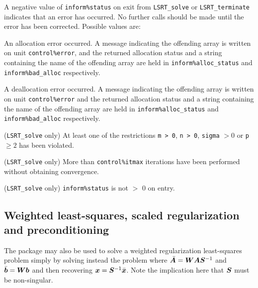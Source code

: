 \documentclass{galahad}
\newcommand{\packagename}{LS\-RT}
\begin{document}

\galerrors
A negative value of  {\tt inform\%status} on exit from
{\tt \packagename\_solve}
or
{\tt \packagename\_terminate}
indicates that an error has occurred. No further calls should be made
until the error has been corrected. Possible values are:

\begin{description}
 An allocation error occurred. A message indicating
the offending
array is written on unit {\tt control\%error}, and the returned allocation
status and a string containing the name of the offending array
are held in {\tt inform\%alloc\_\-status}
and {\tt inform\%bad\_alloc} respectively.

 A deallocation error occurred.
A message indicating the offending
array is written on unit {\tt control\%error} and the returned allocation
status and a string containing the name of the offending array
are held in {\tt inform\%alloc\_\-status}
and {\tt inform\%bad\_alloc} respectively.

 ({\tt \packagename\_solve} only)
At least one of the restrictions
{\tt m > 0},
{\tt n > 0},
{\tt sigma} $> 0$
or
{\tt p} $\geq 2$
has been violated.

 ({\tt \packagename\_solve} only) More than
{\tt control\%itmax} iterations have been performed without obtaining
convergence.

 ({\tt \packagename\_solve} only)  {\tt inform\%status} is
not $>$ 0 on entry.

\end{description}


\subsection{Weighted least-squares, scaled regularization and preconditioning}
The package may also be used to solve a weighted regularization
least-squares problem
simply by solving instead the problem
where $\bar{{\bm{A}}} = {\bm{W}} {\bm{A}} {\bm{S}}^{-1}$ and
$\bar{{\bm{b}}} = {\bm{W}} {\bm{b}}$
and then recovering ${\bm{x}} = {\bm{S}}^{-1} \bar{{\bm{x}}}$. Note the implication here
that ${\bm{S}}$ must be non-singular.
\end{document}
